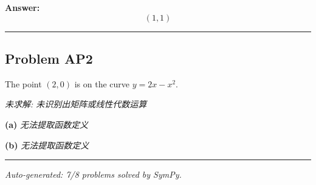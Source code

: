 \documentclass[12pt, a4paper]{article}
\newcommand{\problem}[1]{\subsection*{Problem #1}}
\begin{document}
\textbf{Answer:}
\[\boxed{(1, 1)}\]

\vspace{1em}
\hrule
\vspace{1em}

\problem{AP2}

The point $(2, 0)$ is on the curve $y = 2x - x^2$.

\textit{\color{red} 未求解: 未识别出矩阵或线性代数运算}

\textbf{(a)}
\textit{\color{red} 无法提取函数定义}

\textbf{(b)}
\textit{\color{red} 无法提取函数定义}

\vspace{1em}
\hrule
\vspace{1em}


\vspace{2em}
\noindent\textit{Auto-generated: 7/8 problems solved by SymPy.}
\end{document}
